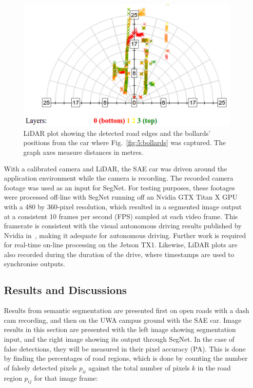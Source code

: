 \begin{figure}[H]
	\centering
	\includegraphics[width=0.8\linewidth]{bollardslidar}
	\caption[Calibration LiDAR plot]{LiDAR plot showing the detected road edges and the bollards' positions from the car where Fig.~\ref{fig:5:bollards} was captured. The graph axes measure distances in metres.}
	\label{fig:5:lidarb}
\end{figure}

With a calibrated camera and LiDAR, the SAE car was driven around the application environment while the camera is recording. The recorded camera footage was used as an input for SegNet. For testing purposes, these footages were processed off-line with SegNet running off an Nvidia GTX Titan X GPU with a 480 by 360-pixel resolution, which resulted in a segmented image output at a consistent 10 frames per second (FPS) sampled at each video frame. This framerate is consistent with the visual autonomous driving results published by Nvidia in~\cite{bojarski_end_2016}, making it adequate for autonomous driving. Further work is required for real-time on-line processing on the Jetson TX1. Likewise, LiDAR plots are also recorded during the duration of the drive, where timestamps are used to synchronise outputs.


\subsection{Results and Discussions}
Results from semantic segmentation are presented first on open roads with a dash cam recording, and then on the UWA campus ground with the SAE car. Image results in this section are presented with the left image showing segmentation input, and the right image showing its output through SegNet. In the case of false detections, they will be measured in their pixel accuracy (PA). This is done by finding the percentages of road regions, which is done by counting the number of falsely detected pixels $p_{ii}$ against the total number of pixels $k$ in the road region $p_{ij}$ for that image frame:

